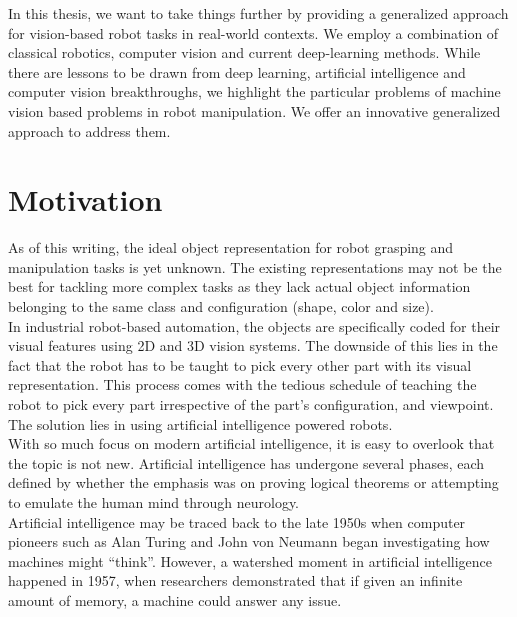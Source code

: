 In this thesis, we want to take things further by providing a generalized approach for vision-based robot tasks in real-world contexts.
We employ a combination of classical robotics, computer vision and current deep-learning methods.
While there are lessons to be drawn from deep learning, artificial intelligence and computer vision breakthroughs,
we highlight the particular problems of machine vision based problems in robot manipulation. We offer an innovative generalized approach to address them.




\section{Motivation}

As of this writing, the ideal object representation for robot grasping and manipulation tasks is yet unknown.
The existing representations may not be the best for tackling more complex tasks as they lack actual
object information belonging to the same class and configuration (shape, color and size).\\

In industrial robot-based automation, the objects are specifically coded for their visual features using 2D and 3D vision systems.
The downside of this lies in the fact that the robot has to be taught to pick every other part with its visual representation.
This process comes with the tedious schedule of teaching the robot to pick every part
irrespective of the part's configuration, and viewpoint. The solution lies in using artificial intelligence powered robots.\\

With so much focus on modern artificial intelligence, it is easy to overlook that the topic is not new.
Artificial intelligence has undergone several phases, each defined by whether the emphasis was on proving logical theorems or attempting to emulate the human mind through neurology.\\

Artificial intelligence may be traced back to the late 1950s when computer pioneers such as Alan Turing and John von Neumann began investigating how machines might ``think''\cite{mit_article}.
However, a watershed moment in artificial intelligence happened in 1957, when researchers demonstrated that if given an infinite amount of memory, a machine could answer any issue.\\

